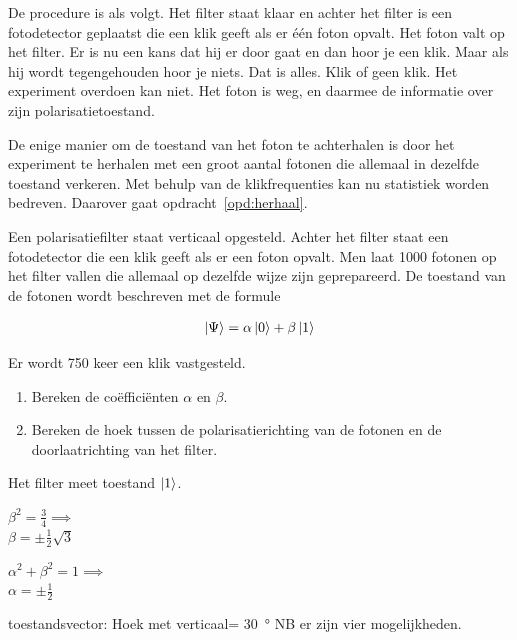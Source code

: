 \documentclass[../../main.tex]{subfiles}
\begin{document}
De procedure is als volgt. Het filter staat klaar en achter het filter is een fotodetector geplaatst die een klik geeft als er \'e\'en foton opvalt. 
Het foton valt op het filter. Er is nu een kans dat hij er door gaat en dan hoor je een klik. Maar als hij wordt tegengehouden hoor je niets. Dat is alles. Klik of geen klik. Het experiment overdoen kan niet. Het foton is weg, en daarmee de informatie over zijn polarisatietoestand.
 
De enige manier om de toestand van het foton te achterhalen is door het experiment te herhalen met een groot aantal fotonen die allemaal in dezelfde toestand verkeren.  Met behulp van de klikfrequenties kan nu statistiek worden bedreven. Daarover gaat opdracht~\ref{opd:herhaal}. 
\medskip
\begin{opdracht}\label{opd:herhaal}
Een polarisatiefilter staat verticaal opgesteld. Achter het filter staat een fotodetector die een klik geeft als er een foton opvalt. 
Men laat 1000 fotonen op het filter vallen die allemaal op dezelfde wijze zijn geprepareerd. De toestand van de fotonen wordt beschreven met de formule 

\[\begin{aligned}\ket{\Psi}=\alpha\ket{0}+\beta\ket{1}\end{aligned}\]

Er wordt 750 keer een klik vastgesteld. 

\begin{enumerate}
\item  Bereken de co\"effici\"enten $\alpha$ en $\beta$.
\item Bereken de hoek tussen de polarisatierichting van de fotonen en de doorlaatrichting van het filter.
\end{enumerate}
\end{opdracht}
\begin{antwoord}[-8cm]
Het filter meet toestand $\ket{1}$.

$\beta^2=\tfrac{3}{4} \implies$\\ $\beta=\pm\tfrac{1}{2}\sqrt{3}$

$\alpha^2+\beta^2=1 \implies$\\ $\alpha=\pm\tfrac{1}{2}$

toestandsvector: Hoek met verticaal= \SI{30}{\degree} NB er zijn vier mogelijkheden.

\end{antwoord}
\end{document}
